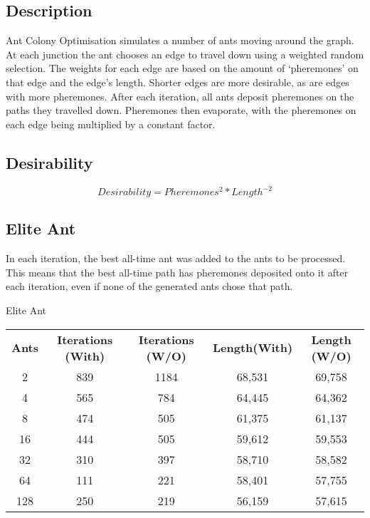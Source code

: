 \documentclass[a4paper, 11pt,table]{article}
\begin{document}
\subsection{Description}
Ant Colony Optimisation simulates a number of ants moving around the graph. At each junction the ant chooses an edge to travel down using a weighted random selection. The weights for each edge are based on the amount of `pheremones' on that edge and the edge's length. Shorter edges are more desirable, as are edges with more pheremones. After each iteration, all ants deposit pheremones on the paths they travelled down. Pheremones then evaporate, with the pheremones on each edge being multiplied by a constant factor.

\subsection{Desirability}
\begin{equation}
Desirability = Pheremones^{2}*Length^{-2}
\end{equation}

\subsection{Elite Ant}
In each iteration, the best all-time ant was added to the ants to be processed. This means that the best all-time path has pheremones deposited onto it after each iteration, even if none of the generated ants chose that path.

\begin{center}
	Elite Ant
	
	\begin{tabu}{|c c c c c|}
		\textbf{Ants} & \textbf{Iterations (With)} & \textbf{Iterations (W/O)} & \textbf{Length(With)} & \textbf{Length (W/O)}\\
		2 & 839 & 1184 & 68,531 & 69,758 \\
		4 & 565 & 784 & 64,445 & 64,362 \\
		8 & 474 & 505 & 61,375 & 61,137 \\
		16 & 444 & 505 & 59,612 & 59,553 \\
		32 & 310 & 397 & 58,710 & 58,582 \\
		64 & 111 & 221 & 58,401 & 57,755 \\
		128 & 250 & 219 & 56,159 & 57,615 \\
	\end{tabu}
\end{center}
\end{document}
